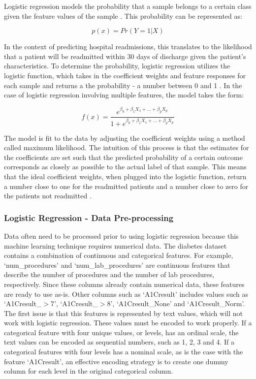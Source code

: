\documentclass[sigconf]{acmart}
\begin{document}
Logistic regression models the probability that a sample belongs to a certain class given the feature values of the sample \cite{cite08}. This probability can be represented as:

\[p(x) = Pr(Y = 1 | X)\]

In the context of predicting hospital readmissions, this translates to the likelihood that a patient will be readmitted within 30 days of discharge given the patient's characteristics. To determine the probability, logistic regression utilizes the logistic function, which takes in the coefficient weights and feature responses for each sample and returns a the probability - a number between 0 and 1 \cite{cite08}. In the case of logistic regression involving multiple features, the model takes the form:

\[ f(x) =\frac{e^{\beta_0 + \beta_1X_1 + ... + \beta_pX_p}}{1 + e^{\beta_0 + \beta_1X_1 + ... + \beta_pX_p}}  \]

The model is fit to the data by adjusting the coefficient weights using a method called maximum likelihood. The intuition of this process is that the estimates for the coefficients are set such that the predicted probability of a certain outcome corresponds as closely as possible to the actual label of that sample. This means that the ideal coefficient weights, when plugged into the logistic function, return a number close to one for the readmitted patients and a number close to zero for the patients not readmitted \cite{cite08}.

\subsubsection{Logistic Regression - Data Pre-processing}

Data often need to be processed prior to using logistic regression because this machine learning technique requires numerical data. The diabetes dataset contains a combination of continuous and categorical features. For example, `num\_procedures' and `num\_lab\_procedures' are continuous features that describe the number of procedures and the number of lab procedures, respectively. Since these columns already contain numerical data, these features are ready to use as-is. Other columns such as `A1Cresult' includes values such as `A1Cresult\_$>$7', `A1Cresult\_$>$8', `A1Cresult\_None' and `A1Cresult\_Norm'. The first issue is that this features is represented by text values, which will not work with logistic regression. These values must be encoded to work properly. If a categorical feature with four unique values, or levels, has an ordinal scale, the text values can be encoded as sequential numbers, such as 1, 2, 3 and 4. If a categorical features with four levels has a nominal scale, as is the case with the feature `A1Cresult', an effective encoding strategy is to create one dummy column for each level in the original categorical column.
\end{document}
